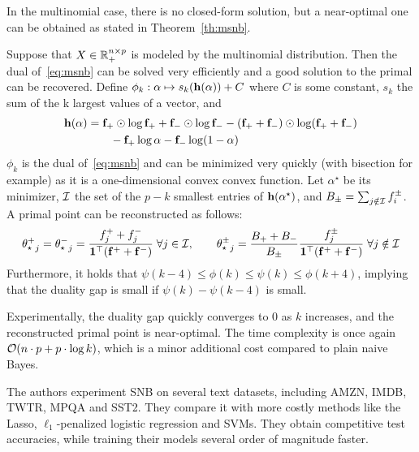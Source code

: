 In the multinomial case, there is no closed-form solution, but a near-optimal one can be obtained as
stated in Theorem~\ref{th:msnb}.
\begin{theorem}\label{th:msnb}
    Suppose that $X \in \mathbb{R}_+^{n \times p}$ is modeled by the multinomial distribution.
    Then the dual of~\ref{eq:msnb} can be solved very efficiently and a good solution to the primal can be recovered.
    Define $\phi_k : \alpha \mapsto s_k(\mathbf{h}(\alpha)) + C$ where $C$ is some constant,
    $s_k$ the sum of the k largest values of a vector, and
    \begin{equation*}
        \begin{split}
            \mathbf{h}(\alpha) &= \mathbf{f}_+ \odot \log \mathbf{f}_+ + \mathbf{f}_- \odot \log \mathbf{f}_-
                    - (\mathbf{f}_+ + \mathbf{f}_-) \odot \log (\mathbf{f}_+ + \mathbf{f}_-)\\
                &\qquad - \mathbf{f}_+ \log \alpha - \mathbf{f}_- \log (1 - \alpha)
        \end{split}
    \end{equation*}
    $\phi_k$ is the dual of~\ref{eq:msnb} and can be minimized very quickly (with bisection for example)
    as it is a one-dimensional convex convex function.
    Let $\alpha^\star$ be its minimizer, $\mathcal{I}$ the set of the $p - k$ smallest entries of
    $\mathbf{h}(\alpha^\star)$, and $B_\pm = \sum_{j \notin \mathcal{I}} f_i^\pm$.
    A primal point can be reconstructed as follows:
    \begin{equation*}
        {\theta^+_\star}_j = {\theta^-_\star}_j = \frac{f_j^+ + f_j^-}{\mathbf{1}^\top(\mathbf{f}^+ + \mathbf{f}^-)}
        \;\forall j \in \mathcal{I}
        ,\qquad
        {\theta^\pm_\star}_j = \frac{B_+ + B_-}{B_\pm}\frac{f^\pm_j}{\mathbf{1}^\top(\mathbf{f}^+ + \mathbf{f}^-)}
        \;\forall j \notin \mathcal{I}
    \end{equation*}
    Furthermore, it holds that $\psi(k - 4) \leq \phi(k) \leq \psi(k) \leq \phi(k + 4)$,
    implying that the duality gap is small if $\psi(k) - \psi(k - 4)$ is small.
\end{theorem}
Experimentally, the duality gap quickly converges to $0$ as $k$ increases,
and the reconstructed primal point is near-optimal.
The time complexity is once again $\mathcal{O}(n \cdot p + p \cdot \log k)$,
which is a minor additional cost compared to plain naive Bayes.

The authors experiment SNB on several text datasets,
including AMZN, IMDB, TWTR, MPQA and SST2.
They compare it with more costly methods like the Lasso, $\ell_1$-penalized logistic regression and SVMs.
They obtain competitive test accuracies, while training their models several order of magnitude faster.


